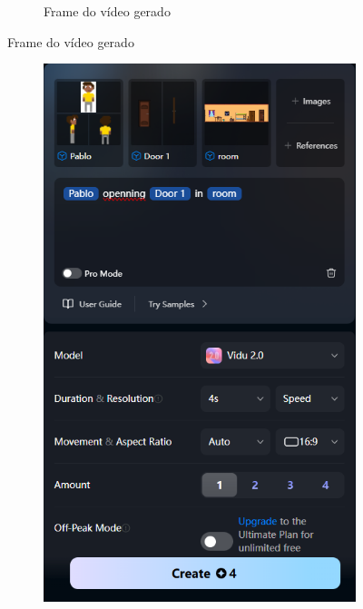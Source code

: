 \begin{figure}[htbp]
\begin{subfigure}{0.55\linewidth}
        \caption{\small Frame do vídeo gerado}
        \label{fig:vidu10b}
    \end{subfigure}
\end{figure}

\begin{figure}[htbp]
    \centering
    \caption{\small Processo da utilização 6 do Vidu em agosto/2025}
    \label{fig:vidu11}
    \begin{subfigure}{0.35\linewidth}
        \includegraphics[width=1\linewidth]{figs/vidu/tela11.PNG}

\end{subfigure}
\end{figure}

